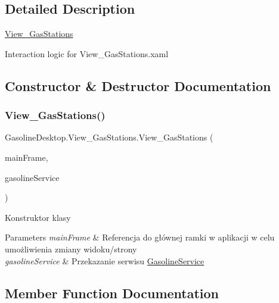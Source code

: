 \subsection{Detailed Description}
\mbox{\hyperlink{class_gasoline_desktop_1_1_view___gas_stations}{View\+\_\+\+Gas\+Stations}} 

Interaction logic for View\+\_\+\+Gas\+Stations.\+xaml

\subsection{Constructor \& Destructor Documentation}
\mbox{\label{class_gasoline_desktop_1_1_view___gas_stations_ab4444d99a2e751821b3aacd11d405c1b}} 
\subsubsection{\texorpdfstring{View\_GasStations()}{View\_GasStations()}}
{\footnotesize\ttfamily Gasoline\+Desktop.\+View\+\_\+\+Gas\+Stations.\+View\+\_\+\+Gas\+Stations (\begin{DoxyParamCaption}\item[{Frame}]{main\+Frame,  }\item[{\mbox{\hyperlink{class_gasoline_desktop_1_1_gasoline_service}{Gasoline\+Service}}}]{gasoline\+Service }\end{DoxyParamCaption})}



Konstruktor klasy 


\begin{DoxyParams}{Parameters}
{\em main\+Frame} & Referencja do głównej ramki w aplikacji w celu umożliwienia zmiany widoku/strony\\
\hline
{\em gasoline\+Service} & Przekazanie serwisu \mbox{\hyperlink{class_gasoline_desktop_1_1_gasoline_service}{Gasoline\+Service}}\\
\hline
\end{DoxyParams}


\subsection{Member Function Documentation}
\mbox{\label{class_gasoline_desktop_1_1_view___gas_stations_a01a630b5a5fd1d7741b967986e45a18b}} 
